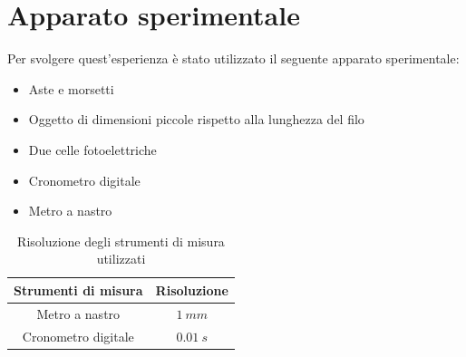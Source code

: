 \documentclass[11pt]{article}
\begin{document}
\section{Apparato sperimentale}

Per svolgere quest'esperienza è stato utilizzato il seguente apparato sperimentale:
\begin{itemize}
    \item Aste e morsetti
    \item Oggetto di dimensioni piccole rispetto alla lunghezza del filo
    \item Due celle fotoelettriche
    \item Cronometro digitale
    \item Metro a nastro
\end{itemize}

\begin{table}[H]
\centering
\begin{tabular}{|c|c|}
\hline
\textbf{Strumenti di misura} & \textbf{Risoluzione} \\
\hline
Metro a nastro & $1\ mm$ \\
Cronometro digitale & $0.01\ s$ \\
\hline
\end{tabular}
\caption{Risoluzione degli strumenti di misura utilizzati}
\label{tab:}
\end{table}
\end{document}
